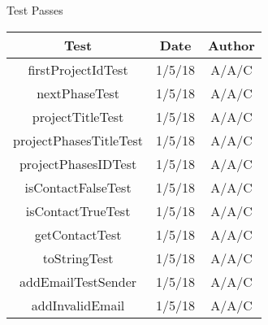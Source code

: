 \documentclass{article}
\begin{document}
\begin{center}
    \vspace{100mm}
    \huge Test Passes \\
    \vspace{5mm}
    \small
    \begin{tabular}{|c|c|c|}
        \hline
        Test & Date & Author \\
        \hline
        firstProjectIdTest & 1/5/18 & A/A/C \\
        \hline
        nextPhaseTest & 1/5/18 & A/A/C \\
        \hline
        projectTitleTest & 1/5/18 & A/A/C \\
        \hline
        projectPhasesTitleTest & 1/5/18 & A/A/C \\
        \hline
        projectPhasesIDTest & 1/5/18 & A/A/C \\
        \hline
        isContactFalseTest & 1/5/18 & A/A/C \\
        \hline
        isContactTrueTest & 1/5/18 & A/A/C\\
        \hline
        getContactTest & 1/5/18 & A/A/C \\
        \hline
        toStringTest & 1/5/18 & A/A/C \\
        \hline
        addEmailTestSender & 1/5/18 & A/A/C \\
        \hline
        addInvalidEmail & 1/5/18 & A/A/C \\
        \hline
    \end{tabular}





    \end{center}
\end{document}
